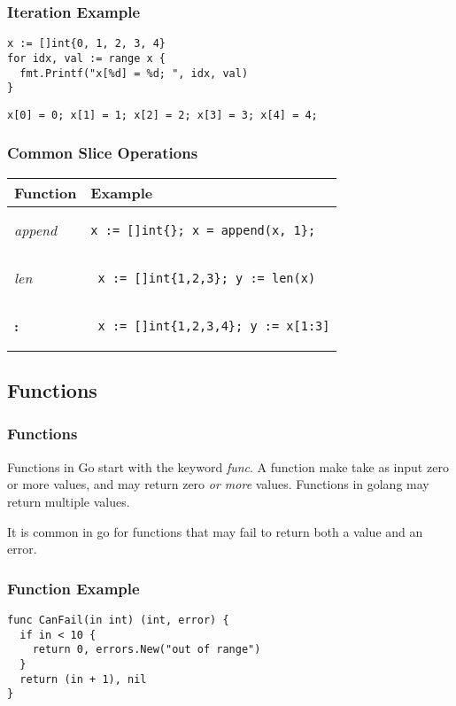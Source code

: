 \documentclass{beamer}
\begin{document}
\begin{frame}[fragile]
  \frametitle{Iteration Example}
\begin{lstlisting}[language=Golang]
x := []int{0, 1, 2, 3, 4}
for idx, val := range x {
  fmt.Printf("x[%d] = %d; ", idx, val)
}
\end{lstlisting}
\begin{verbatim}
x[0] = 0; x[1] = 1; x[2] = 2; x[3] = 3; x[4] = 4;
\end{verbatim}
\end{frame}

\begin{frame}[fragile]
  \frametitle{Common Slice Operations}
  \begin{tabular}{| l | p{3in} |}
    \hline
    Function  & Example \\
    \hline
    \emph{append} &
\begin{verbatim}x := []int{}; x = append(x, 1};\end{verbatim}
    \\
    \hline
    \emph{len} &
\begin{verbatim} x := []int{1,2,3}; y := len(x)\end{verbatim}
    \\
    \hline
    {\bf :} &
\begin{verbatim} x := []int{1,2,3,4}; y := x[1:3]\end{verbatim}
    \\
    \hline
  \end{tabular}
\end{frame}

\subsection{Functions}

\begin{frame}
  \frametitle{Functions}
  Functions in Go start with the keyword \emph{func}.  A function make
  take as input zero or more values, and may return zero \emph{or
    more} values.  Functions in golang may return multiple values.

  It is common in go for functions that may fail to return both a
  value and an error.
\end{frame}

\begin{frame}[fragile]
  \frametitle{Function Example}
\begin{lstlisting}[language=Golang]
func CanFail(in int) (int, error) {
  if in < 10 {
    return 0, errors.New("out of range")
  }
  return (in + 1), nil
}
\end{lstlisting}
\end{frame}
\end{document}
